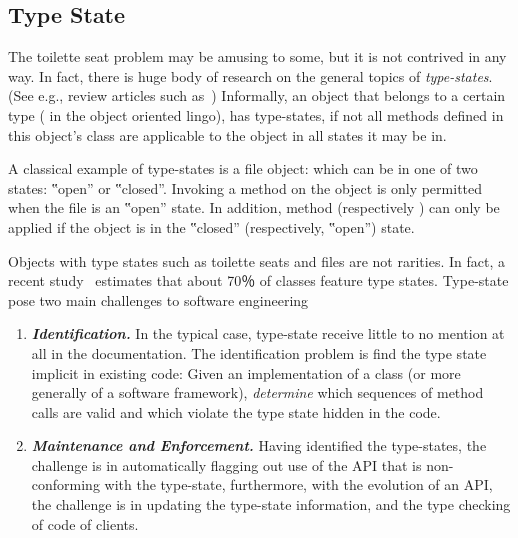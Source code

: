 \subsection{Type State}
The toilette seat problem may be amusing to some, but it is not contrived in any way.
In fact, there is huge body of research on the general topics of
  \emph{type-states}. (See e.g., review articles such as~\cite{Aldrich:Sunshine:2009,Bierhoff:Aldrich:2005})
Informally, an object that belongs to a certain type ( in the
object oriented lingo), has type-states, if not all methods defined in this object's class are applicable to the object in all states it may be in.

A classical example of type-states is a file object: which can be in one of two states:
‟open” or ‟closed”. Invoking a  method on the object is only permitted when the file is an ‟open” state.
In addition, method  (respectively ) can only be applied if the object is in the ‟closed” (respectively, ‟open”) state.

Objects with type states such as toilette seats and files are not rarities.
In fact, a recent study~\cite{Search:For:Aldrich} estimates 
  that about 70％ of \Java classes feature type states.
Type-state pose two main challenges to software engineering 
\begin{enumerate}
  \item \emph{\textbf{Identification.}} 
    In the typical case, type-state 
        receive little to no mention at all in the documentation.
    The identification problem is find the
    type state implicit in existing code: Given an implementation of a class
    (or more generally of a software framework), 
    \emph{determine} which sequences of method calls are valid and which violate the 
    type state hidden in the code.
  \item \emph{\textbf{Maintenance and Enforcement.}}
    Having identified the type-states, the challenge is in automatically flagging out 
      use of the API that is non-conforming with the type-state, furthermore, with the 
      evolution of an API, the challenge is in updating the type-state information, 
      and the type checking of code of clients. 
\end{enumerate}
